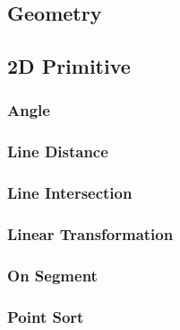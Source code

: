 \documentclass[9pt, landscape, a4paper,twosided]{extarticle}
\begin{document}
\begin{multicols*}{3}
\section{Geometry}
\subsection{2D Primitive}
\subsubsection{Angle}

\subsubsection{Line Distance}

\subsubsection{Line Intersection}

\subsubsection{Linear Transformation}

\subsubsection{On Segment}

\subsubsection{Point Sort}
\begin{verbatim}


\end{verbatim}
\end{multicols*}
\end{document}
